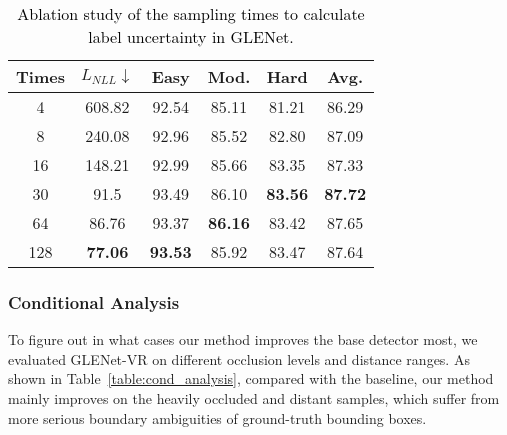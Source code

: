 \documentclass[twocolumn]{svjour3}
\newcommand{\revise}[1]{\textcolor{black}{#1}}
\begin{document}
\setlength{\tabcolsep}{7pt}
\begin{table}
	\centering
	\caption{\revise{Ablation study of the sampling times to calculate label uncertainty in GLENet.}}
	\label{table:ablation_sampling_times}
	\begin{tabular}{c|c|cccc} 
		\toprule
		Times & $L_{NLL}$$\downarrow$ & Easy  & Mod.  & Hard  & Avg.   \\ 
		\hline
		4   & 608.82 & 92.54 & 85.11 & 81.21 & 86.29  \\
		8   & 240.08 & 92.96 & 85.52 & 82.80 & 87.09  \\
		16  & 148.21 & 92.99 & 85.66 & 83.35 & 87.33  \\
		30  & 91.5   & 93.49 & 86.10 & \textbf{83.56} & \textbf{87.72}  \\
		64  & 86.76  & 93.37 & \textbf{86.16} & 83.42 & 87.65  \\
		128 & \textbf{77.06}  & \textbf{93.53} & 85.92 & 83.47 & 87.64  \\
		\bottomrule
	\end{tabular}
\end{table}
\setlength{\tabcolsep}{1.5pt}


\subsubsection{Conditional Analysis}\label{con_analysis}
To figure out in what cases our method improves the base detector most, we evaluated GLENet-VR on different occlusion levels and distance ranges. As shown in Table~\ref{table:cond_analysis}, compared with the baseline, our method mainly improves on the heavily occluded and distant samples, which suffer from more serious boundary ambiguities of ground-truth bounding boxes. 
\end{document}
